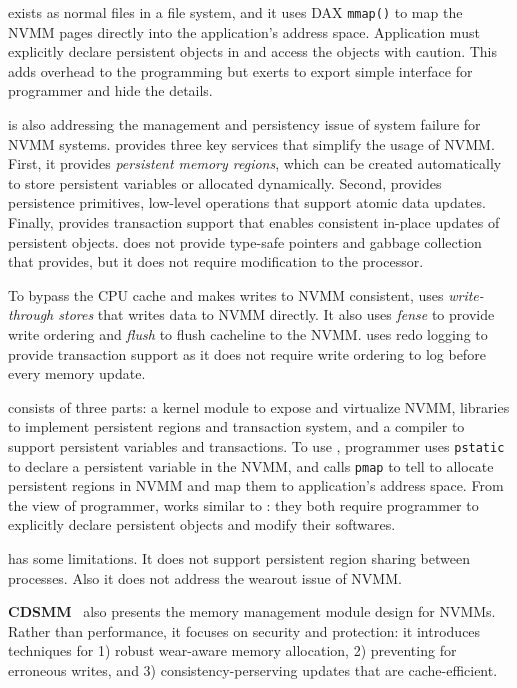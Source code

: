 \nvh{} exists as normal files in a file system, and it uses DAX
\texttt{mmap()} to map the NVMM pages directly into the application's
address space. Application must explicitly declare persistent objects in
\nvh{} and access the objects with caution. This adds overhead to the
programming but \nvh{} exerts to export simple interface for programmer
and hide the details.

\mnem{} is also addressing the management and persistency issue
of system failure for NVMM systems. \mnem{} provides three key services
that simplify the usage of NVMM. First, it provides \emph{persistent
memory regions}, which can be created automatically to store persistent 
variables or allocated dynamically. Second, \mnem{} provides persistence
primitives, low-level operations that support atomic data updates. Finally,
\mnem{} provides transaction support that enables consistent in-place
updates of persistent objects. \mnem{} does not provide type-safe pointers
and gabbage collection that \nvh{} provides, but it does not require
modification to the processor.

To bypass the CPU cache and makes writes to NVMM consistent, \mnem{} uses
\emph{write-through stores} that writes data to NVMM directly. It also
uses \emph{fense} to provide write ordering and \emph{flush} to flush
cacheline to the NVMM. \mnem{} uses redo logging to provide transaction support
as it does not require write ordering to log before every memory update.

\mnem{} consists of three parts: a kernel module to expose and virtualize NVMM, 
libraries to implement persistent regions and transaction system, and
a compiler to support persistent variables and transactions. To use \mnem{},
programmer uses \texttt{pstatic} to declare a persistent variable in the NVMM,
and calls \texttt{pmap} to tell \mnem{} to allocate persistent regions in NVMM
and map them to application's address space. From the view of programmer,
\mnem{} works similar to \nvh{}: they both require programmer to explicitly
declare persistent objects and modify their softwares.

\mnem{} has some limitations. It does not support persistent region sharing
between processes. Also it does not address the wearout issue of NVMM.

\textbf{CDSMM}~\cite{CDSMM} also presents the memory management module design
 for NVMMs.
Rather than performance, it focuses on security and protection: it introduces
techniques for 1) robust wear-aware memory allocation, 2) preventing for 
erroneous writes, and 3) consistency-perserving updates that are cache-efficient.

